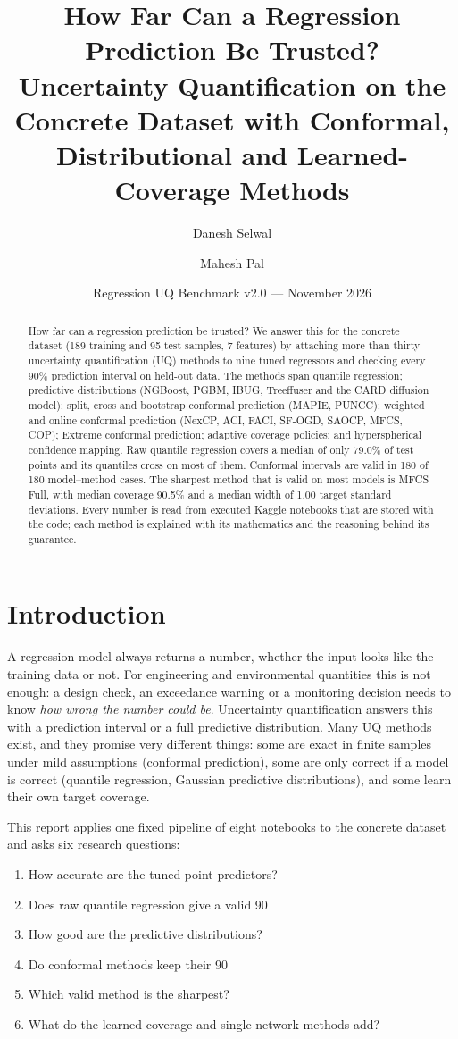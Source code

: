 \documentclass[11pt]{article}
\title{How Far Can a Regression Prediction Be Trusted?\\[2pt] \large Uncertainty Quantification on the Concrete Dataset with Conformal, Distributional and Learned-Coverage Methods}
\author{Danesh Selwal \and Mahesh Pal}
\date{Regression UQ Benchmark v2.0 --- November 2026}
\begin{document}
\maketitle
\begin{abstract}How far can a regression prediction be trusted? We answer this for the concrete dataset (189 training and 95 test samples, 7 features) by attaching more than thirty uncertainty quantification (UQ) methods to nine tuned regressors and checking every 90\% prediction interval on held-out data. The methods span quantile regression; predictive distributions (NGBoost, PGBM, IBUG, Treeffuser and the CARD diffusion model); split, cross and bootstrap conformal prediction (MAPIE, PUNCC); weighted and online conformal prediction (NexCP, ACI, FACI, SF-OGD, SAOCP, MFCS, COP); Extreme conformal prediction; adaptive coverage policies; and hyperspherical confidence mapping. Raw quantile regression covers a median of only 79.0\% of test points and its quantiles cross on most of them. Conformal intervals are valid in 180 of 180 model--method cases. The sharpest method that is valid on most models is MFCS Full, with median coverage 90.5\% and a median width of 1.00 target standard deviations. Every number is read from executed Kaggle notebooks that are stored with the code; each method is explained with its mathematics and the reasoning behind its guarantee.\end{abstract}
\tableofcontents
\newpage
\section{Introduction}
A regression model always returns a number, whether the input looks like the training data or not. For engineering and environmental
quantities this is not enough: a design check, an exceedance warning or a monitoring decision needs to know \emph{how wrong the number could be}.
Uncertainty quantification answers this with a prediction interval or a full predictive distribution. Many UQ methods exist, and they
promise very different things: some are exact in finite samples under mild assumptions (conformal prediction), some are only correct if a
model is correct (quantile regression, Gaussian predictive distributions), and some learn their own target coverage.

This report applies one fixed pipeline of eight notebooks to the concrete dataset and asks six research questions:
\begin{enumerate}[label=\textbf{RQ\arabic*.}]
\item How accurate are the tuned point predictors?
\item Does raw quantile regression give a valid 90%
\item How good are the predictive distributions?
\item Do conformal methods keep their 90%
\item Which valid method is the sharpest?
\item What do the learned-coverage and single-network methods add?
\end{enumerate}
\end{document}
